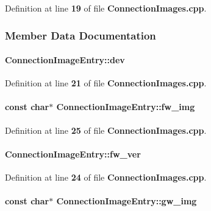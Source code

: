 Definition at line {\bf 19} of file {\bf Connection\+Images.\+cpp}.



\subsubsection{Member Data Documentation}
\paragraph[{dev}]{ Connection\+Image\+Entry\+::dev}\label{structConnectionImageEntry_ad3e976515b7bc2b721fc7c1f25870fd7}


Definition at line {\bf 21} of file {\bf Connection\+Images.\+cpp}.

\paragraph[{fw\+\_\+img}]{\setlength{\rightskip}{0pt plus 5cm}const char$\ast$ Connection\+Image\+Entry\+::fw\+\_\+img}\label{structConnectionImageEntry_a12965830bd5b2a452ca30bd7149cd6a6}


Definition at line {\bf 25} of file {\bf Connection\+Images.\+cpp}.

\paragraph[{fw\+\_\+ver}]{ Connection\+Image\+Entry\+::fw\+\_\+ver}\label{structConnectionImageEntry_a7fe82f2bd8f2d26721649ed287464e1e}


Definition at line {\bf 24} of file {\bf Connection\+Images.\+cpp}.

\paragraph[{gw\+\_\+img}]{\setlength{\rightskip}{0pt plus 5cm}const char$\ast$ Connection\+Image\+Entry\+::gw\+\_\+img}\label{structConnectionImageEntry_a8c810df3910ac124da1816feca634a71}


